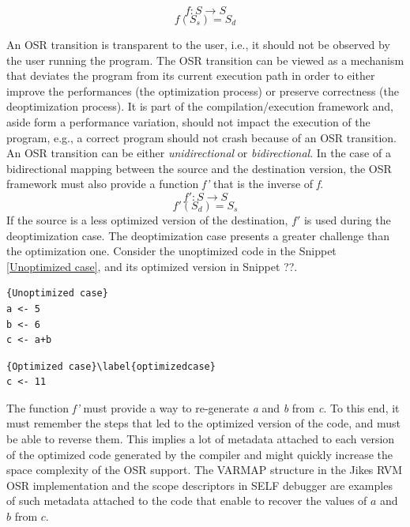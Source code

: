 \[f: S \rightarrow S\]
\[f(S_s) = S_d\]

An OSR transition is transparent to the user, i.e., it should not be observed by the user running the program.
The OSR transition can be viewed as a mechanism that deviates the program from its current execution path in order to either improve the performances (the optimization process) or preserve correctness (the deoptimization process).
It is part of the compilation/execution framework and, aside form a performance variation, should not impact the execution of the program, e.g., a correct program should not crash because of an OSR transition.\\

An OSR transition can be either \textit{unidirectional} or \textit{bidirectional}.
In the case of a bidirectional mapping between the source and the destination version, the OSR framework must also provide a function \textit{f'} that is the inverse of \textit{f}.  
\[f': S \rightarrow S\]
\[f'(S_d) = S_s\]
If the source is a less optimized version of the destination, $f'$ is used during the deoptimization case.
The deoptimization case presents a greater challenge than the optimization one.
Consider the unoptimized code in the Snippet \ref{Unoptimized case}, and its optimized version in Snippet ??.

\begin{lstlisting}[caption=Unoptimized case]{Unoptimized case}
a <- 5
b <- 6
c <- a+b
\end{lstlisting}\label{unoptimizedcase}
\begin{lstlisting}[caption=Optimized case]{Optimized case}\label{optimizedcase}
c <- 11
\end{lstlisting}

The function \textit{f'} must provide a way to re-generate \textit{a} and \textit{b} from \textit{c}. 
To this end, it must remember the steps that led to the optimized version of the code, and must be able to reverse them.
This implies a lot of metadata attached to each version of the optimized code generated by the compiler and might quickly increase the space complexity of the OSR support.
The VARMAP structure in the Jikes RVM OSR implementation\cite{soman2006efficient} and the scope descriptors in SELF debugger\cite{holzle1992debugging} are examples of such metadata attached to the code that enable to recover the values of $a$ and $b$ from $c$.\\
 
